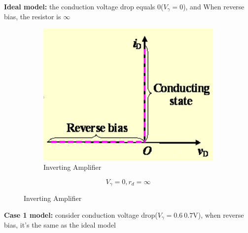 \documentclass[a4paper,11pt,UTF8]{article}
\begin{document}
\textbf{Ideal model:} the conduction voltage drop equals 0($V_\gamma=0$), and When reverse bias, the resistor is $\infty$
\begin{figure}[H]
	\begin{minipage}{.5\textwidth}
		\begin{figure}[H] 
			\centering 
			\includegraphics[scale=0.2]{./img/1.1}
			\caption{Inverting Amplifier}
		\end{figure}
	\end{minipage}
	\begin{minipage}{.5\textwidth}
		\LARGE{$$
			V_\gamma=0, r_d=\infty
			$$}
	\end{minipage}
\end{figure}
\textbf{Case 1 model:} consider conduction voltage drop($V_\gamma=0.6~0.7$V), when reverse bias, it's the same as the ideal model
\end{document}
